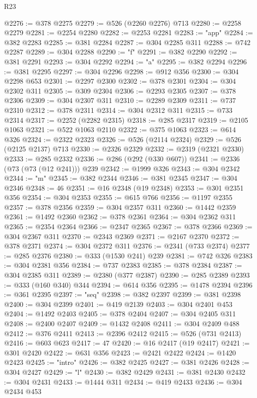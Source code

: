 \begin{lexlean}{R23}
\begin{coremodule}
@2276 := @378 @2275
@2279 := @526 (@2260 @2276) @713
@2280 := @2258 @2279
@2281 := @2254 @2280
@2282 := @2253 @2281
@2283 := "app"
@2284 := @382 @2283
@2285 := @381 @2284
@2287 := @304 @2285 @311
@2288 := @742 @2287
@2289 := @304 @2288
@2290 := "f"
@2291 := @382 @2290
@2292 := @381 @2291
@2293 := @304 @2292
@2294 := "a"
@2295 := @382 @2294
@2296 := @381 @2295
@2297 := @304 @2296
@2298 := @912 @356
@2300 := @304 @2298 @653
@2301 := @2297 @2300
@2302 := @378 @2301
@2304 := @304 @2302 @311
@2305 := @309 @2304
@2306 := @2293 @2305
@2307 := @378 @2306
@2309 := @304 @2307 @311
@2310 := @2289 @2309
@2311 := @737 @2310
@2312 := @378 @2311
@2314 := @304 @2312 @311
@2315 := @733 @2314
@2317 := @2252 (@2282 @2315)
@2318 := @285 @2317
@2319 := @2105 @1063
@2321 := @522 @1063 @2110
@2322 := @375 @1063
@2323 := @614 @326
@2324 := @2322 @2323
@2326 := @526 (@2114 @2324)
@2329 := @526 (@2125 @2137) @713
@2330 := @2326 @2329
@2332 := @2319 (@2321 @2330)
@2333 := @285 @2332
@2336 := @286 (@292 (@330 @607))
@2341 := @2336 (@73 (@73 (@12 @241))) @239
@2342 := @1999 @326
@2343 := @304 @2342
@2344 := "m"
@2345 := @382 @2344
@2346 := @381 @2345
@2347 := @304 @2346
@2348 := 46
@2351 := @16 @2348 (@19 @2348)
@2353 := @301 @2351 @356
@2354 := @304 @2353
@2355 := @615 @766
@2356 := @1197 @2355
@2357 := @378 @2356
@2359 := @304 @2357 @311
@2360 := @1442 @2359
@2361 := @1492 @2360
@2362 := @378 @2361
@2364 := @304 @2362 @311
@2365 := @2354 @2364
@2366 := @2347 @2365
@2367 := @378 @2366
@2369 := @304 @2367 @311
@2370 := @2343 @2369
@2371 := @2167 @2370
@2372 := @378 @2371
@2374 := @304 @2372 @311
@2376 := @2341 (@733 @2374)
@2377 := @285 @2376
@2380 := @333 (@1530 @241) @239
@2381 := @742 @326
@2383 := @304 @2381 @356
@2384 := @737 @2383
@2385 := @378 @2384
@2387 := @304 @2385 @311
@2389 := @2380 (@377 @2387)
@2390 := @285 @2389
@2393 := @333 (@160 @340) @344
@2394 := @614 @356
@2395 := @1478 @2394
@2396 := @361 @2395
@2397 := "seq"
@2398 := @382 @2397
@2399 := @381 @2398
@2400 := @304 @2399
@2401 := @419 @2139
@2403 := @304 @2401 @453
@2404 := @1492 @2403
@2405 := @378 @2404
@2407 := @304 @2405 @311
@2408 := @2400 @2407
@2409 := @1432 @2408
@2411 := @304 @2409 @488
@2412 := @376 @2411
@2413 := @2396 @2412
@2415 := @526 (@731 @2413)
@2416 := @603 @623
@2417 := 47
@2420 := @16 @2417 (@19 @2417)
@2421 := @301 @2420
@2422 := @631 @356
@2423 := @2421 @2422
@2424 := @1420 @2423
@2425 := "intro"
@2426 := @382 @2425
@2427 := @381 @2426
@2428 := @304 @2427
@2429 := "l"
@2430 := @382 @2429
@2431 := @381 @2430
@2432 := @304 @2431
@2433 := @1444 @311
@2434 := @419 @2433
@2436 := @304 @2434 @453

\end{coremodule}
\end{lexlean}
